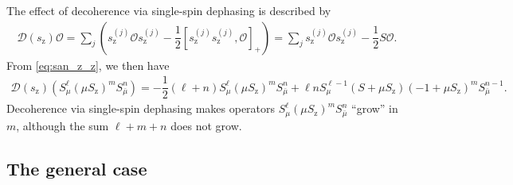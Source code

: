\documentclass[pra,twocolumn,longbibliography]{revtex4-2}
\newcommand{\f}[2]{\dfrac{#1}{#2}} %
\newcommand{\p}[1]{\left( #1 \right)} %
\renewcommand{\sp}[1]{\left[ #1 \right]} %
\newcommand{\D}{\mathcal{D}}
\renewcommand{\O}{\mathcal{O}}
\newcommand{\z}{\text{z}}
\newcommand{\bmu}{{\bar\mu}}
\newcommand{\1}{\mathds{1}}
\begin{document}
The effect of decoherence via single-spin dephasing is described by
\begin{align}
  \D\p{s_\z} \O
  = \sum_j\p{s_\z^{(j)} \O s_\z^{(j)}
    - \f12\sp{s_\z^{(j)} s_\z^{(j)},\O}_+}
  = \sum_j s_\z^{(j)} \O s_\z^{(j)} - \f12 S \O.
\end{align}
From \eqref{eq:san_z_z}, we then have
\begin{align}
  \D\p{s_\z} \p{S_\mu^\ell \p{\mu S_\z}^m S_\bmu^n}
  = -\f12\p{\ell+n} S_\mu^\ell \p{\mu S_\z}^m S_\bmu^n
  + \ell n S_\mu^{\ell-1} \p{S + \mu S_\z}
  \p{-1 + \mu S_\z}^m S_\bmu^{n-1}.
\end{align}
Decoherence via single-spin dephasing makes operators
$S_\mu^\ell \p{\mu S_\z}^m S_\bmu^n$ ``grow'' in $m$, although the sum
$\ell+m+n$ does not grow.


\subsection{The general case}
\label{sec:general_single}
\end{document}
